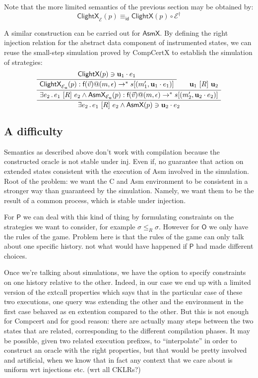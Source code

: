 \documentclass[acmsmall,anonymous]{acmart}
\makeatletter
\newcommand{\kw}[1]{\ensuremath{ \textsf{#1} }}
\newcommand{\ifr}[1]{\ [{#1}]\ }
\newcommand{\mcall}[3]{\kw{#1}({#2})@{#3}}
\makeatother
\begin{document}
Note that the more limited semantics of the previous section
may be obtained by:
\[ \kw{ClightX}_\mathcal{E}(p) \equiv_\kw{id} \kw{ClightX}(p) \circ \mathcal{E}^\dagger \]

A similar construction can be carried out for $\kw{AsmX}$.
By defining the right injection relation
for the abstract data component of instrumented states,
we can reuse the small-step simulation proved by CompCertX
to establish the simulation of strategies:
\[
  \AxiomC{$\kw{ClightX}(p) \ni \mathbf{u}_1 \cdot e_1$}
  \UnaryInfC{$\kw{ClightX}_{\mathcal{E}_\mathbf{u}}(p) :
    \mcall{f}{\vec{v}}{(m, \epsilon)} \rightarrow^* s[(m_1', \mathbf{u}_1 \cdot e_1)]$}
  \AxiomC{$\mathbf{u}_1 \ifr{R} \mathbf{u}_2$}
  \BinaryInfC{$\exists e_2 \,.\, e_1 \ifr{R} e_2 \wedge
    \kw{AsmX}_{\mathcal{E}_\mathbf{u}}(p) :
      \mcall{f}{\vec{v}}{(m, \epsilon)} \rightarrow^*
      s[(m_2', \mathbf{u}_2 \cdot e_2)]$}
  \UnaryInfC{$\exists e_2 \,.\, e_1 \ifr{R} e_2 \wedge
    \kw{AsmX}(p) \ni \mathbf{u}_2 \cdot e_2$}
  \DisplayProof
\]

\subsection{A difficulty}

Semantics as described above
don't work with compilation
because the constructed oracle is not stable under inj.
Even if,
no guarantee that action on extended states consistent
with the execution of Asm involved in the simulation.
Root of the problem:
we want the C and Asm environment
to be consistent in a stronger way than
guaranteed by the simulation.
Namely,
we want them to be the result of a common process,
which is stable under injection.

For \kw{P} we can deal with this kind of thing
by formulating constraints on the strategies we want to consider,
for example $\sigma \le_R \sigma$.
However for \kw{O} we only have the rules of the game.
Problem here is that the rules of the game
can only talk about one specific history.
not what would have happened if \kw{P} had made different choices.

Once we're talking about simulations,
we have the option to specify constraints
on one history relative to the other.
Indeed,
in our case we end up with a limited version
of the extcall properties
which says that in the particular case
of these two executions,
one query was extending the other
and the environment in the first case
behaved as en extention compared to the other.
But this is not enough for Compcert and for good reason:
there are actually many steps between the two states
that are related,
corresponding to the different compilation phases.
It may be possible,
given two related execution prefixes,
to ``interpolate'' in order to construct an oracle
with the right properties,
but that would be pretty involved and artificial,
when we know that in fact any context that we care about
is uniform wrt injections etc.
(wrt all CKLRs?)
\end{document}
